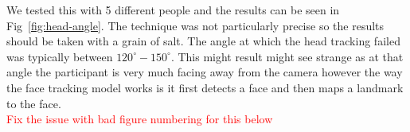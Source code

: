 We tested this with 5 different people and the results can be seen in Fig~\ref{fig:head-angle}. The technique was not particularly precise so the results should be taken with a grain of salt. The angle at which the head tracking failed was typically between $120^{\circ} - 150^{\circ}$. This might result might see strange as at that angle the participant is very much facing away from the camera however the way the face tracking model works is it first detects a face and then maps a landmark to the face. \\ 


\textcolor{red}{Fix the issue with bad figure numbering for this below}
\begin{invisBox}  
	\hfill
\end{invisBox}

